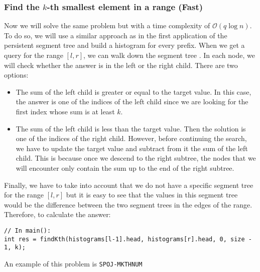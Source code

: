 \subsubsection{Find the $k$-th smallest element in a range (Fast)}
Now we will solve the same problem but with a time complexity of 
$\mathcal{O}(q\log n)$. To do so, we will use a similar approach as in 
the first application of the persistent segment tree and build a histogram 
for every prefix. 
When we get a query for the range $[l,r]$, we can walk down the segment tree
. In each node, we will check whether
the answer is in the left or the right child. There are two options:
\begin{itemize}
		\item The sum of the left child is greater or equal to the target value.
				In this case, the answer is one of the indices of the left
				child since we are looking for the first index whose sum is
				at least $k$.
		\item The sum of the left child is less than the target value. Then 
				the solution is one of the indices of the right child.
				However, before continuing the search, we have to update the 
				target value and subtract from it the sum of the left child.
				This is because once we descend to the right subtree, the nodes
				that we will encounter only contain the sum up to the end of
				the right subtree.
\end{itemize}
Finally, we have to take into account that we do not have a specific segment
tree for the range $[l,r]$ but it is easy to see that the values in this 
segment tree would be the difference between the two segment trees in the 
edges of the range. Therefore, to calculate the answer:
\begin{verbatim}
// In main():
int res = findKth(histograms[l-1].head, histograms[r].head, 0, size - 1, k);
\end{verbatim}
An example of this problem is \texttt{SPOJ-MKTHNUM}














